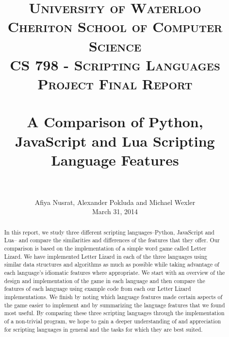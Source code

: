 \documentclass[letterpaper, 12pt, titlepage, final]{article}
\title{
		\usefont{OT1}{bch}{b}{n}
		\normalfont \normalsize \textsc{University of Waterloo\\Cheriton School of Computer Science\\CS 798 - Scripting Languages Project Final Report} \\ [25pt]
		\horrule{0.5pt} \\[0.4cm]
		\huge A Comparison of Python, JavaScript and Lua Scripting Language Features \\
		\horrule{2pt} \\[0.5cm]
}
\author{
		\normalfont \normalsize
        Afiya Nusrat, Alexander Pokluda and Michael Wexler\\[-3pt] \normalsize
        March 31, 2014
}
\date{}
\begin{document}
\maketitle

\thispagestyle{fancy}

\begin{abstract}

In this report, we study three different scripting languages--Python, JavaScript and Lua--
and compare the similarities and differences of the features that they offer.
Our comparison is based on the implementation of a simple word game called Letter Lizard.
We have implemented Letter Lizard in each of the three languages using similar
data structures and algorithms as much as possible while taking advantage of each
language's idiomatic features where appropriate. We start with an overview of the
design and implementation of the game in each language and then compare the
features of each language using example code from each our Letter Lizard implementations.
We finish by noting which language features made certain aspects of the game
easier to implement and by summarizing the language features that we found most
useful. By comparing these three scripting languages through the implementation
of a non-trivial program, we hope to gain a deeper understanding of and appreciation
for scripting languages in general and the tasks for which they are best suited.

\end{abstract}

\cleardoublepage

\renewcommand\contentsname{Table of Contents}
\tableofcontents
\cleardoublepage
{}

\listoffigures
\cleardoublepage
{}		%

\lstlistoflistings
\cleardoublepage
{}		%


\cleardoublepage

\setcounter{page}{1}
\end{document}
